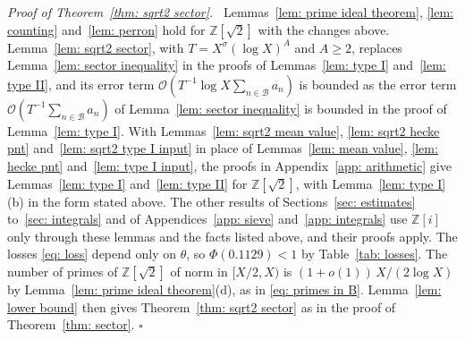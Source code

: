 \documentclass{article}
\numberwithin{equation}{section}
\newenvironment{proof}[1][Proof]{\par\medskip\noindent\textit{#1.}\ }{\hfill$\square$\par\medskip}
\newcommand{\Ge}{\geqslant}
\begin{document}
\begin{proof}[Proof of Theorem~\ref{thm: sqrt2 sector}]
Lemmas~\ref{lem: prime ideal theorem}, \ref{lem: counting} and~\ref{lem: perron} hold for $\mathbb{Z}[\sqrt{2}]$ with the changes above. Lemma~\ref{lem: sqrt2 sector}, with $T = X^{\sigma}(\log X)^A$ and $A \Ge 2$, replaces Lemma~\ref{lem: sector inequality} in the proofs of Lemmas~\ref{lem: type I} and~\ref{lem: type II}, and its error term $\mathcal{O}(T^{-1} \log X \sum_{n \in \mathcal{B}} a_n)$ is bounded as the error term $\mathcal{O}(T^{-1} \sum_{n \in \mathcal{B}} a_n)$ of Lemma~\ref{lem: sector inequality} is bounded in the proof of Lemma~\ref{lem: type I}. With Lemmas~\ref{lem: sqrt2 mean value}, \ref{lem: sqrt2 hecke pnt} and~\ref{lem: sqrt2 type I input} in place of Lemmas~\ref{lem: mean value}, \ref{lem: hecke pnt} and~\ref{lem: type I input}, the proofs in Appendix~\ref{app: arithmetic} give Lemmas~\ref{lem: type I} and~\ref{lem: type II} for $\mathbb{Z}[\sqrt{2}]$, with Lemma~\ref{lem: type I}(b) in the form stated above. The other results of Sections~\ref{sec: estimates} to~\ref{sec: integrals} and of Appendices~\ref{app: sieve} and~\ref{app: integrals} use $\mathbb{Z}[i]$ only through these lemmas and the facts listed above, and their proofs apply. The losses \eqref{eq: loss} depend only on $\theta$, so $\Phi(0.1129) < 1$ by Table~\ref{tab: losses}. The number of primes of $\mathbb{Z}[\sqrt{2}]$ of norm in $[X/2, X)$ is $(1 + o(1))\, X/(2\log X)$ by Lemma~\ref{lem: prime ideal theorem}(d), as in \eqref{eq: primes in B}. Lemma~\ref{lem: lower bound} then gives Theorem~\ref{thm: sqrt2 sector} as in the proof of Theorem~\ref{thm: sector}.
\end{proof}



\end{document}
